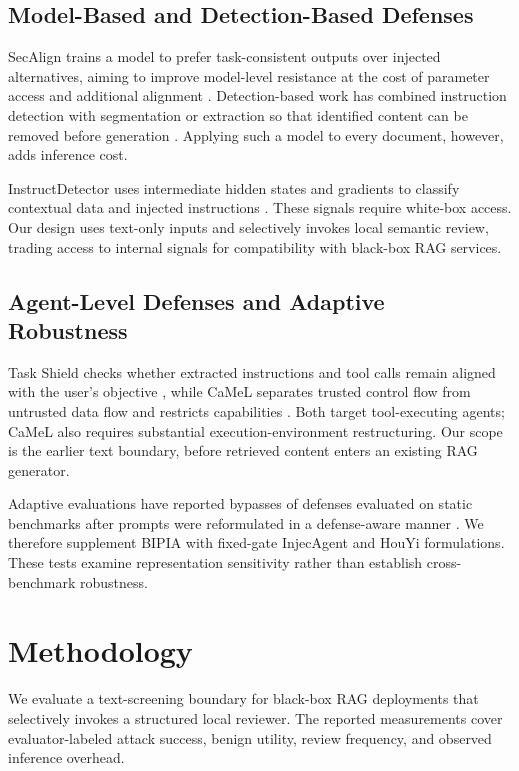 \documentclass[conference,a4paper]{IEEEtran}
\begin{document}
\subsection{Model-Based and Detection-Based Defenses}
SecAlign trains a model to prefer task-consistent outputs over injected alternatives, aiming to improve model-level resistance at the cost of parameter access and additional alignment \cite{b9}. Detection-based work has combined instruction detection with segmentation or extraction so that identified content can be removed before generation \cite{b10}. Applying such a model to every document, however, adds inference cost.

InstructDetector uses intermediate hidden states and gradients to classify contextual data and injected instructions \cite{b11}. These signals require white-box access. Our design uses text-only inputs and selectively invokes local semantic review, trading access to internal signals for compatibility with black-box RAG services.

\subsection{Agent-Level Defenses and Adaptive Robustness}
Task Shield checks whether extracted instructions and tool calls remain aligned with the user's objective \cite{b12}, while CaMeL separates trusted control flow from untrusted data flow and restricts capabilities \cite{b13}. Both target tool-executing agents; CaMeL also requires substantial execution-environment restructuring. Our scope is the earlier text boundary, before retrieved content enters an existing RAG generator.

Adaptive evaluations have reported bypasses of defenses evaluated on static benchmarks after prompts were reformulated in a defense-aware manner \cite{b14}. We therefore supplement BIPIA with fixed-gate InjecAgent \cite{b15} and HouYi \cite{b16} formulations. These tests examine representation sensitivity rather than establish cross-benchmark robustness.

\section{Methodology}
We evaluate a text-screening boundary for black-box RAG deployments that selectively invokes a structured local reviewer. The reported measurements cover evaluator-labeled attack success, benign utility, review frequency, and observed inference overhead.
\end{document}
